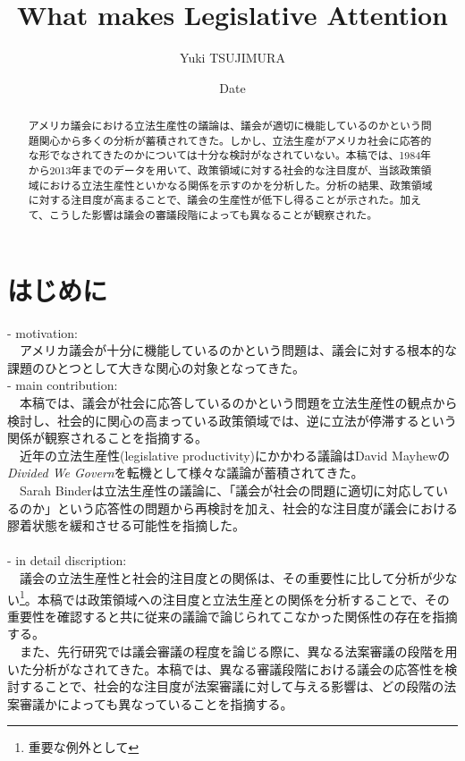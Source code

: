 \documentclass[here]{article}
\title{What makes Legislative Attention}
\author{Yuki TSUJIMURA}
\date{Date}
\begin{document}
\maketitle

\begin{abstract}
アメリカ議会における立法生産性の議論は、議会が適切に機能しているのかという問題関心から多くの分析が蓄積されてきた。しかし、立法生産がアメリカ社会に応答的な形でなされてきたのかについては十分な検討がなされていない。本稿では、1984年から2013年までのデータを用いて、政策領域に対する社会的な注目度が、当該政策領域における立法生産性といかなる関係を示すのかを分析した。分析の結果、政策領域に対する注目度が高まることで、議会の生産性が低下し得ることが示された。加えて、こうした影響は議会の審議段階によっても異なることが観察された。
\end{abstract}


\section{はじめに}
- motivation: 
\\
　アメリカ議会が十分に機能しているのかという問題は、議会に対する根本的な課題のひとつとして大きな関心の対象となってきた。\\
- main contribution: 
\\
　本稿では、議会が社会に応答しているのかという問題を立法生産性の観点から検討し、社会的に関心の高まっている政策領域では、逆に立法が停滞するという関係が観察されることを指摘する。\\
　近年の立法生産性(legislative productivity)にかかわる議論はDavid Mayhewの\textit{Divided We Govern}を転機として様々な議論が蓄積されてきた。\\
　Sarah Binderは立法生産性の議論に、「議会が社会の問題に適切に対応しているのか」という応答性の問題から再検討を加え、社会的な注目度が議会における膠着状態を緩和させる可能性を指摘した。\citep*{Binder2003-bn}\\
\\
- in detail discription:
\\
　議会の立法生産性と社会的注目度との関係は、その重要性に比して分析が少ない\footnote{重要な例外として\citet*{Adler2013-ay}}。本稿では政策領域への注目度と立法生産との関係を分析することで、その重要性を確認すると共に従来の議論で論じられてこなかった関係性の存在を指摘する。\\
　また、先行研究では議会審議の程度を論じる際に、異なる法案審議の段階を用いた分析がなされてきた。本稿では、異なる審議段階における議会の応答性を検討することで、社会的な注目度が法案審議に対して与える影響は、どの段階の法案審議かによっても異なっていることを指摘する。\\
\end{document}
